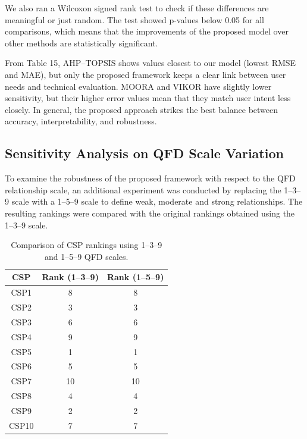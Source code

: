\documentclass[twocolumn]{svjour3}
\begin{document}
\begin{table}[htbp]
\centering
\caption{Execution Time (in seconds) for Different Numbers of CSPs and Attributes.}
\label{tab:runtime}
\end{table}

We also ran a Wilcoxon signed rank test to check if these differences are meaningful or just random. The test showed p-values below 0.05 for all comparisons, which means that the improvements of the proposed model over other methods are statistically significant.

From Table 15, AHP--TOPSIS shows values closest to our model (lowest RMSE and MAE), but only the proposed framework keeps a clear link between user needs and technical evaluation. MOORA and VIKOR have slightly lower sensitivity, but their higher error values mean that they match user intent less closely. In general, the proposed approach strikes the best balance between accuracy, interpretability, and robustness.


\subsection{Sensitivity Analysis on QFD Scale Variation}
To examine the robustness of the proposed framework with respect to the QFD relationship scale, an additional experiment was conducted by replacing the 1--3--9 scale with a 1--5--9 scale to define weak, moderate and strong relationships. The resulting rankings were compared with the original rankings obtained using the 1--3--9 scale.

\begin{table}[h!]
\centering
\caption{Comparison of CSP rankings using 1--3--9 and 1--5--9 QFD scales.}
\label{tab:sensitivity_qfd}
\begin{tabular}{ccc}
\hline
\textbf{CSP} & \textbf{Rank (1--3--9)} & \textbf{Rank (1--5--9)} \\
\hline
CSP1  & 8  & 8  \\
CSP2  & 3  & 3  \\
CSP3  & 6  & 6 \\
CSP4  & 9  & 9  \\
CSP5  & 1  & 1  \\
CSP6  & 5  & 5  \\
CSP7  & 10 & 10 \\
CSP8  & 4  & 4  \\
CSP9  & 2  & 2  \\
CSP10 & 7  & 7  \\
\hline
\end{tabular}
\end{table}
\end{document}
